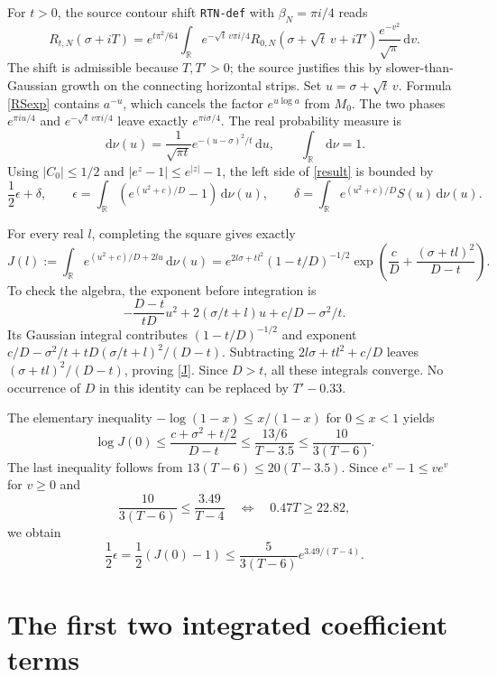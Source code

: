 \documentclass[11pt]{article}
\newcommand{\R}{\mathbb R}
\newcommand{\dd}{\,\mathrm d}
\begin{document}
For $t>0$, the source contour shift \texttt{RTN-def} with
$\beta_N=\pi i/4$ reads
\[
 R_{t,N}(\sigma+iT)=e^{t\pi^2/64}
 \int_\R e^{-\sqrt t\,v\pi i/4}
 R_{0,N}(\sigma+\sqrt t\,v+iT')
                         \frac{e^{-v^2}}{\sqrt\pi}\dd v.
\]
The shift is admissible because $T,T'>0$; the source justifies
this by slower-than-Gaussian growth on the connecting horizontal
strips. Set $u=\sigma+\sqrt t\,v$. Formula \eqref{RSexp} contains
$a^{-u}$, which cancels the factor $e^{u\log a}$ from $M_0$.
The two phases $e^{\pi iu/4}$ and $e^{-\sqrt t\,v\pi i/4}$
leave exactly $e^{\pi i\sigma/4}$. The real probability measure is
\[
 \dd\nu(u)=\frac1{\sqrt{\pi t}}e^{-(u-\sigma)^2/t}\dd u,
 \qquad \int_\R\dd\nu=1.
\]
Using $|C_0|\le1/2$ and $|e^z-1|\le e^{|z|}-1$, the left
side of \eqref{result} is bounded by
\begin{equation}\label{epsdelta}
 \frac12\epsilon+\delta,\qquad
 \epsilon=\int_\R(e^{(u^2+c)/D}-1)\dd\nu(u),\qquad
 \delta=\int_\R e^{(u^2+c)/D}S(u)\dd\nu(u).
\end{equation}

For every real $l$, completing the square gives exactly
\begin{equation}\label{J}
 J(l):=\int_\R e^{(u^2+c)/D+2lu}\dd\nu(u)
 =e^{2l\sigma+tl^2}(1-t/D)^{-1/2}
       \exp\!\left(\frac cD+\frac{(\sigma+tl)^2}{D-t}\right).
\end{equation}
To check the algebra, the exponent before integration is
\[
 -\frac{D-t}{tD}u^2+2(\sigma/t+l)u+c/D-\sigma^2/t.
\]
Its Gaussian integral contributes $(1-t/D)^{-1/2}$ and exponent
$c/D-\sigma^2/t+tD(\sigma/t+l)^2/(D-t)$.
Subtracting $2l\sigma+tl^2+c/D$ leaves
$(\sigma+tl)^2/(D-t)$, proving \eqref{J}. Since $D>t$,
all these integrals converge. No occurrence of $D$ in this identity
can be replaced by $T'-0.33$.

The elementary inequality $-\log(1-x)\le x/(1-x)$ for
$0\le x<1$ yields
\[
 \log J(0)\le\frac{c+\sigma^2+t/2}{D-t}
 \le\frac{13/6}{T-3.5}\le\frac{10}{3(T-6)}.
\]
The last inequality follows from $13(T-6)\le20(T-3.5)$.
Since $e^v-1\le ve^v$ for $v\ge0$ and
\[
 \frac{10}{3(T-6)}\le\frac{3.49}{T-4}
 \quad\Longleftrightarrow\quad 0.47T\ge22.82,
\]
we obtain
\begin{equation}\label{epsilonfinal}
 \frac12\epsilon=\frac12(J(0)-1)
       \le\frac5{3(T-6)}e^{3.49/(T-4)}.
\end{equation}

\section{The first two integrated coefficient terms}
\end{document}

